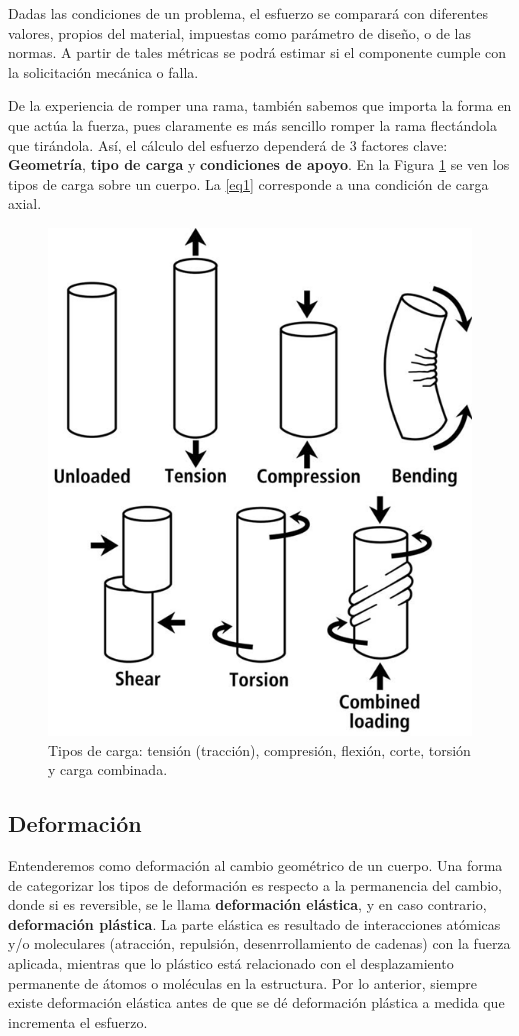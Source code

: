 Dadas las condiciones de un problema, el esfuerzo se comparará con diferentes valores, propios del material, impuestas como parámetro de diseño, o de las normas. A partir de tales métricas se podrá estimar si el componente cumple con la solicitación mecánica o falla.

De la experiencia de romper una rama, también sabemos que importa la forma en que actúa la fuerza, pues claramente es más sencillo romper la rama flectándola que tirándola. Así, el cálculo del esfuerzo dependerá de 3 factores clave: \textbf{Geometría}, \textbf{tipo de carga} y \textbf{condiciones de apoyo}. En la Figura \ref{fig:1} se ven los tipos de carga sobre un cuerpo. La \ref{eq1} corresponde a una condición de carga axial. 

\begin{figure}[h!]
    \centering
    \includegraphics[width=0.5\linewidth]{imgs/loads.png}
    \caption{Tipos de carga: tensión (tracción), compresión, flexión, corte, torsión y carga combinada.}
    \label{fig:1}
\end{figure}

\subsection{Deformación}

Entenderemos como deformación al cambio geométrico de un cuerpo. Una forma de categorizar los tipos de deformación es respecto a la permanencia del cambio, donde si es reversible, se le llama \textbf{deformación elástica}, y en caso contrario, \textbf{deformación plástica}. La parte elástica es resultado de interacciones atómicas y/o moleculares (atracción, repulsión, desenrrollamiento de cadenas) con la fuerza aplicada, mientras que lo plástico está relacionado con el desplazamiento permanente de átomos o moléculas en la estructura. Por lo anterior, siempre existe deformación elástica antes de que se dé deformación plástica a medida que incrementa el esfuerzo.

